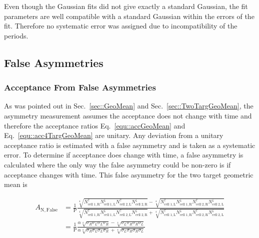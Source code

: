 Even though the Gaussian fits did not give exactly a standard Gaussian, the fit
parameters are well compatible with a standard Gaussian within the errors of the
fit.  Therefore no systematic error was assigned due to incompatibility of the
periods.

\subsection{False Asymmetries}
\subsubsection{Acceptance From False Asymmetries}
As was pointed out in Sec.~\ref{sec::GeoMean} and
Sec.~\ref{sec::TwoTargGeoMean}, the asymmetry measurement assumes the acceptance
does not change with time and therefore the acceptance ratios
Eq.~\ref{equ::accGeoMean} and Eq.~\ref{equ::acc4TargGeoMean} are unitary.  Any
deviation from a unitary acceptance ratio is estimated with a false asymmetry
and is taken as a systematic error.  To determine if acceptance
does change with time, a false asymmetry is calculated where the only way the
false asymmetry could be non-zero is if acceptance changes with time.  This
false asymmetry for the two target geometric mean is

\begin{equation}
  \label{equ::falseAcc}
  \begin{split}
    A_{\mathrm{N,False}} &= 
    \frac{1}{\mathrm{P}}
    \frac{
      \sqrt[4]{
        N_{\mathrm{cell\;1,R}}^{\uparrow}N_{\mathrm{cell\;1, L}}^{\downarrow}
        N_{\mathrm{cell\;2,L}}^{\uparrow}N_{\mathrm{cell\;2, R}}^{\downarrow}
      } -
      \sqrt[4]{
        N_{\mathrm{cell\;1,L}}^{\uparrow}N_{\mathrm{cell\;1, R}}^{\downarrow}
        N_{\mathrm{cell\;2,R}}^{\uparrow}N_{\mathrm{cell\;2, L}}^{\downarrow}
      }
    }{
      \sqrt[4]{
        N_{\mathrm{cell\;1,R}}^{\uparrow}N_{\mathrm{cell\;1, L}}^{\downarrow}
        N_{\mathrm{cell\;2,L}}^{\uparrow}N_{\mathrm{cell\;2, R}}^{\downarrow}
      } +
      \sqrt[4]{
        N_{\mathrm{cell\;1,L}}^{\uparrow}N_{\mathrm{cell\;1, R}}^{\downarrow}
        N_{\mathrm{cell\;2,R}}^{\uparrow}N_{\mathrm{cell\;2, L}}^{\downarrow}
      }
    }\\
    & =
    \frac{1}{\mathrm{P}}
    \frac{
      \alpha \sqrt[4]{\sigma_{R}\sigma_{L}\sigma_{L}\sigma_{R}} -
      \sqrt[4]{\sigma_{L}\sigma_{R}\sigma_{R}\sigma_{L}}
    }{
      \alpha \sqrt[4]{\sigma_{R}\sigma_{L}\sigma_{L}\sigma_{R}} +
      \sqrt[4]{\sigma_{L}\sigma_{R}\sigma_{R}\sigma_{L}}
    }
  \end{split}
\end{equation}

